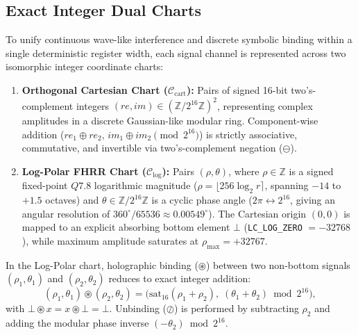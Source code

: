 \documentclass[11pt, a4paper]{article}
\begin{document}
\subsection{Exact Integer Dual Charts}
To unify continuous wave-like interference and discrete symbolic binding within a single deterministic register width, each signal channel is represented across two isomorphic integer coordinate charts:
\begin{enumerate}
    \item \textbf{Orthogonal Cartesian Chart ($\mathcal{C}_{\mathrm{cart}}$):} Pairs of signed 16-bit two's-complement integers $(re, im) \in (\mathbb{Z}/2^{16}\mathbb{Z})^2$, representing complex amplitudes in a discrete Gaussian-like modular ring. Component-wise addition ($re_1 \oplus re_2,\, im_1 \oplus im_2 \pmod{2^{16}}$) is strictly associative, commutative, and invertible via two's-complement negation ($\ominus$).
    \item \textbf{Log-Polar FHRR Chart ($\mathcal{C}_{\mathrm{log}}$):} Pairs $(\rho, \theta)$, where $\rho \in \mathbb{Z}$ is a signed fixed-point $Q7.8$ logarithmic magnitude ($\rho = \lfloor 256 \log_2 r \rceil$, spanning $-14$ to $+1.5$ octaves) and $\theta \in \mathbb{Z}/2^{16}\mathbb{Z}$ is a cyclic phase angle ($2\pi \leftrightarrow 2^{16}$, giving an angular resolution of $360^\circ / 65536 \approx 0.00549^\circ$). The Cartesian origin $(0, 0)$ is mapped to an explicit absorbing bottom element $\bot$ (\texttt{LC\_LOG\_ZERO} $= -32768$), while maximum amplitude saturates at $\rho_{\max} = +32767$.
\end{enumerate}

In the Log-Polar chart, holographic binding ($\circledast$) between two non-bottom signals $(\rho_1, \theta_1)$ and $(\rho_2, \theta_2)$ reduces to exact integer addition:
\begin{equation}
    (\rho_1, \theta_1) \circledast (\rho_2, \theta_2) = \bigl(\mathrm{sat}_{16}(\rho_1 + \rho_2),\; (\theta_1 + \theta_2) \bmod 2^{16}\bigr),
\end{equation}
with $\bot \circledast x = x \circledast \bot = \bot$. Unbinding ($\oslash$) is performed by subtracting $\rho_2$ and adding the modular phase inverse $(-\theta_2) \bmod 2^{16}$.
\end{document}

